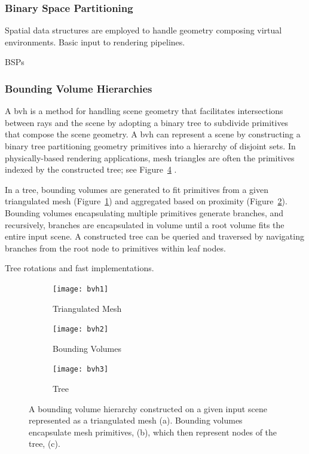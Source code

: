 \subsubsection{Binary Space Partitioning}


Spatial data structures are employed to handle geometry composing virtual environments. 
Basic input to rendering pipelines. 

BSPs

\subsubsection{Bounding Volume Hierarchies}
A \acrfull{bvh} is a method for handling scene geometry that facilitates intersections between rays and the scene by adopting a binary tree to subdivide primitives that compose the scene geometry. A \acrshort{bvh} can represent a scene by constructing a binary tree partitioning geometry primitives into a hierarchy of disjoint sets. In physically-based rendering applications, mesh triangles are often the primitives indexed by the constructed tree; see Figure~\ref{fig:bvh-diagram} \citep{pharr2023physically}.\par
In a tree, bounding volumes are generated to fit primitives from a given triangulated mesh (Figure~\ref{fig:sub_bvh1}) and aggregated based on proximity (Figure~\ref{fig:sub_bvh2}). Bounding volumes encapsulating multiple primitives generate branches, and recursively, branches are encapsulated in volume until a root volume fits the entire input scene. A constructed tree can be queried and traversed by navigating branches from the root node to primitives within leaf nodes.\par

Tree rotations and fast implementations.
\citep{kopta2012fast}
 

\begin{figure}
    \centering
    \begin{subfigure}[t]{0.3\textwidth}
       \centering
       \texttt{[image: bvh1]}\label{fig:sub_bvh1}
       \caption{Triangulated Mesh}
    \end{subfigure}
    \hfill
    \begin{subfigure}[t]{0.3\textwidth}
       \centering
       \texttt{[image: bvh2]}\label{fig:sub_bvh2}
       \caption{Bounding Volumes}
    \end{subfigure}

    \begin{subfigure}[t]{0.8\textwidth}
        \centering
        \texttt{[image: bvh3]}\label{fig:sub_bvh3}
        \caption{Tree}
    \end{subfigure}
    \caption{A bounding volume hierarchy constructed on a given input scene represented as a triangulated mesh (a). Bounding volumes encapsulate mesh primitives, (b), which then represent nodes of the tree, (c).}\label{fig:bvh-diagram}
\end{figure}
        


